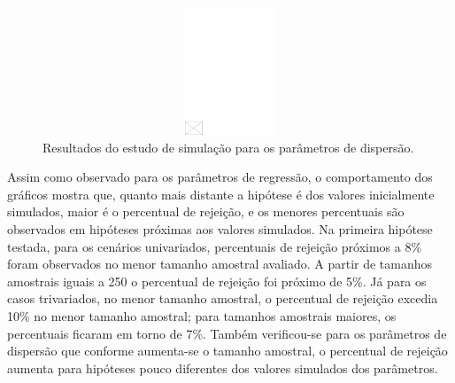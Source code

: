\documentclass[AMA,STIX1COL]{WileyNJD-v2}
\begin{document}
\begin{figure}[h]
\centerline{\includegraphics[width=342pt,height=9pc,draft]{empty}}
\caption{Resultados do estudo de simulação para os parâmetros de dispersão.\label{fig3}}
\end{figure}

Assim como observado para os parâmetros de regressão, o comportamento dos gráficos mostra que, quanto mais distante a hipótese é dos valores inicialmente simulados, maior é o percentual de rejeição, e os menores percentuais são observados em hipóteses próximas aos valores simulados. Na primeira hipótese testada, para os cenários univariados, percentuais de rejeição próximos a 8\% foram observados no menor tamanho amostral avaliado. A partir de tamanhos amostrais iguais a 250 o percentual de rejeição foi próximo de 5\%. Já para os casos trivariados, no menor tamanho amostral, o percentual de rejeição excedia 10\% no menor tamanho amostral; para tamanhos amostrais maiores, os percentuais ficaram em torno de 7\%. Também verificou-se para os parâmetros de dispersão que conforme aumenta-se o tamanho amostral, o percentual de rejeição aumenta para hipóteses pouco diferentes dos valores simulados dos parâmetros.
\end{document}
